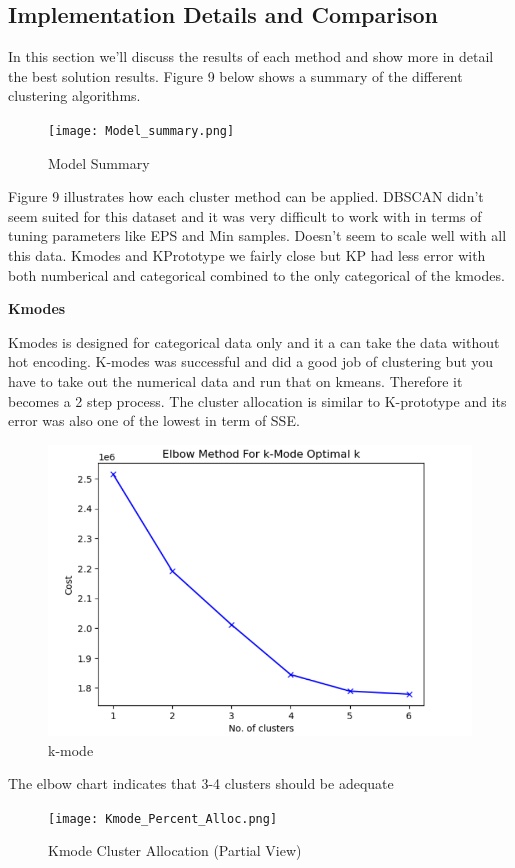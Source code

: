 \documentclass[conference]{IEEEtran}
\begin{document}
\subsection{Implementation Details and Comparison}

 
In this section we'll discuss the results of each method and show more in detail the best solution results.  Figure 9 below shows a summary of the different clustering algorithms.
\begin{figure}[!h]
	\texttt{[image: Model\_summary.png]}
	\caption{Model Summary}
	\label{fig: Model_summary}
\end{figure}

Figure 9 illustrates how each cluster method can be applied.  DBSCAN didn't seem suited for this dataset and it was very difficult to work with in terms of tuning parameters like EPS and Min samples.  Doesn't seem to scale well with all this data.  Kmodes and KPrototype we fairly close but KP had less error with both numberical and categorical combined to the only categorical of the kmodes.  

\begin{center} 
\textbf{Kmodes} 
\end{center}
Kmodes is designed for categorical data only and it a can take the data without hot encoding.  K-modes was successful and did a good job of clustering but you have to take out the numerical data and run that on kmeans.  Therefore it becomes a 2 step process.  The cluster allocation is similar to K-prototype and its error was also one of the lowest in term of SSE.

\begin{figure}[!h]
	\includegraphics[width=\linewidth]{k_mode_elbow.png}
	\caption{k-mode}
	\label{fig: Kmode Elbow Chart}
 \end{figure}
The elbow chart indicates that 3-4 clusters should be adequate
\begin{figure}[!h]
	\texttt{[image: Kmode\_Percent\_Alloc.png]}
	\caption{Kmode Cluster Allocation (Partial View)}
	\label{fig: Kmode Cluster Allocation (Partial View)}
 \end{figure}
\end{document}
